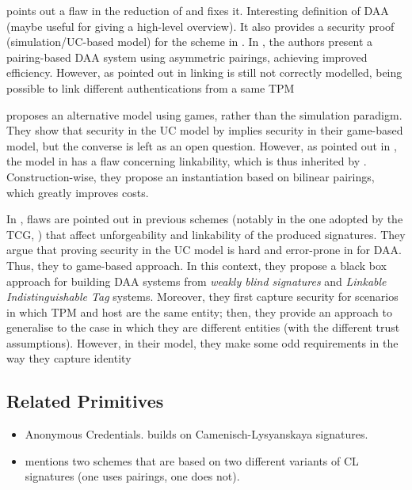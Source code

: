 \cite{cms08} points out a flaw in the reduction of \cite{bcc04} and fixes it.
Interesting definition of DAA (maybe useful for giving a high-level overview).
It also provides a security proof (simulation/UC-based model) for the
scheme in \cite{cms08b}. In \cite{cms08b}, the authors present a pairing-based
DAA system using asymmetric pairings, achieving improved efficiency.
However, as pointed out in \cite{bfg+13} linking is still not correctly modelled,
being possible to link different authentications from a same TPM 

\cite{bcl09} proposes an alternative model using games, rather than the
simulation paradigm. They show that security in the UC model by \cite{bcc04}
implies security in their game-based model, but the converse is left as an
open question. However, as pointed out in \cite{bfg+13}, the model in
\cite{bcc04} has a flaw concerning linkability, which is thus inherited by
\cite{bcl09}. 
Construction-wise, they propose an instantiation based on bilinear pairings,
which greatly improves costs.

In \cite{bfg+13}, flaws are pointed out in previous schemes (notably in the
one adopted by the TCG, \cite{bcc04}) that affect unforgeability and linkability
of the produced signatures. They argue that proving security in the UC model is
hard and error-prone in for DAA. Thus, they to game-based approach. In this
context, they propose a black box approach for building DAA systems from
\emph{weakly blind signatures} and \emph{Linkable Indistinguishable Tag} systems.
Moreover, they first capture security for scenarios in which TPM and host are
the same entity; then, they provide an approach to generalise to the case
in which they are different entities (with the different trust assumptions).
However, in their model, they make some odd requirements in the way they
capture identity 

\subsection{Related Primitives}

\begin{itemize}
\item Anonymous Credentials. \cite{bcc04} builds on Camenisch-Lysyanskaya
  signatures.
\item \cite{cms08b} mentions two schemes that are based on two different
  variants of CL signatures (one uses pairings, one does not).
\end{itemize}

